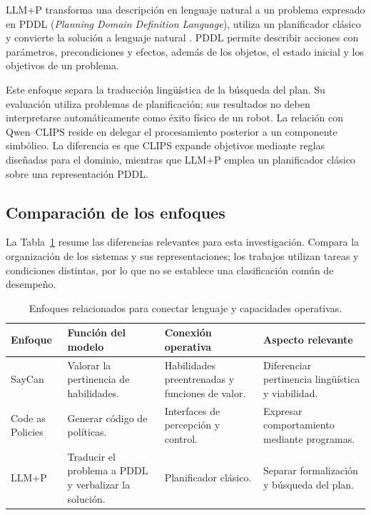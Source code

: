 LLM+P transforma una descripción en lenguaje natural a un problema expresado en PDDL (\textit{Planning Domain Definition Language}), utiliza un planificador clásico y convierte la solución a lenguaje natural \cite{liu2023llmp}. PDDL permite describir acciones con parámetros, precondiciones y efectos, además de los objetos, el estado inicial y los objetivos de un problema.

Este enfoque separa la traducción lingüística de la búsqueda del plan. Su evaluación utiliza problemas de planificación; sus resultados no deben interpretarse automáticamente como éxito físico de un robot. La relación con Qwen--CLIPS reside en delegar el procesamiento posterior a un componente simbólico. La diferencia es que CLIPS expande objetivos mediante reglas diseñadas para el dominio, mientras que LLM+P emplea un planificador clásico sobre una representación PDDL.

\subsection{Comparación de los enfoques}

La Tabla~\ref{tab:antecedentes_planificacion} resume las diferencias relevantes para esta investigación. Compara la organización de los sistemas y sus representaciones; los trabajos utilizan tareas y condiciones distintas, por lo que no se establece una clasificación común de desempeño.

\begin{table}[htbp]
\centering
\small
\caption{Enfoques relacionados para conectar lenguaje y capacidades operativas.}
\label{tab:antecedentes_planificacion}
\begin{tabularx}{\textwidth}{@{}p{}XXX@{}}
\toprule
\textbf{Enfoque} & \textbf{Función del modelo} & \textbf{Conexión operativa} & \textbf{Aspecto relevante} \\
\midrule
SayCan \cite{ahn2022saycan} & Valorar la pertinencia de habilidades. & Habilidades preentrenadas y funciones de valor. & Diferenciar pertinencia lingüística y viabilidad. \\
\addlinespace
Code as Policies \cite{liang2022codeaspolicies} & Generar código de políticas. & Interfaces de percepción y control. & Expresar comportamiento mediante programas. \\
\addlinespace
LLM+P \cite{liu2023llmp} & Traducir el problema a PDDL y verbalizar la solución. & Planificador clásico. & Separar formalización y búsqueda del plan. \\
\bottomrule
\end{tabularx}
\end{table}

